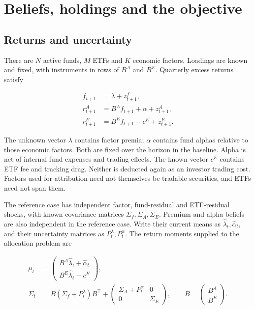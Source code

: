 \documentclass[11pt]{article}
\begin{document}
\section{Beliefs, holdings and the objective}\label{sec:2}

\subsection{Returns and uncertainty}\label{sec:2.1}

There are \(N\) active funds, \(M\) ETFs and \(K\) economic factors. Loadings are known and fixed, with instruments in rows of \(B^A\) and \(B^E\). Quarterly excess returns satisfy

\begin{equation*}
\begin{aligned}
f_{t+1}&=\lambda+z^f_{t+1},\\
r^A_{t+1}&=B^A f_{t+1}+\alpha+z^A_{t+1},\\
r^E_{t+1}&=B^E f_{t+1}-c^E+z^E_{t+1}.
\end{aligned}
\tag{1}\label{eq:1}
\end{equation*}

The unknown vector \(\lambda\) contains factor premia; \(\alpha\) contains fund alphas relative to those economic factors. Both are fixed over the horizon in the baseline. Alpha is net of internal fund expenses and trading effects. The known vector \(c^E\) contains ETF fee and tracking drag. Neither is deducted again as an investor trading cost. Factors used for attribution need not themselves be tradable securities, and ETFs need not span them.

The reference case has independent factor, fund-residual and ETF-residual shocks, with known covariance matrices \(\Sigma_f,\Sigma_A,\Sigma_E\). Premium and alpha beliefs are also independent in the reference case. Write their current means as \(\hat\lambda_t,\hat\alpha_t\), and their uncertainty matrices as \(P^\lambda_t,P^\alpha_t\). The return moments supplied to the allocation problem are

\begin{equation*}
\begin{aligned}
\mu_t&=\begin{pmatrix}B^A\hat\lambda_t+\hat\alpha_t\\B^E\hat\lambda_t-c^E\end{pmatrix},\\
\Sigma_t&=B(\Sigma_f+P^\lambda_t)B^\top+
\begin{pmatrix}\Sigma_A+P^\alpha_t&0\\0&\Sigma_E\end{pmatrix},
\qquad B=\begin{pmatrix}B^A\\B^E\end{pmatrix}.
\end{aligned}
\tag{2}\label{eq:2}
\end{equation*}
\end{document}
